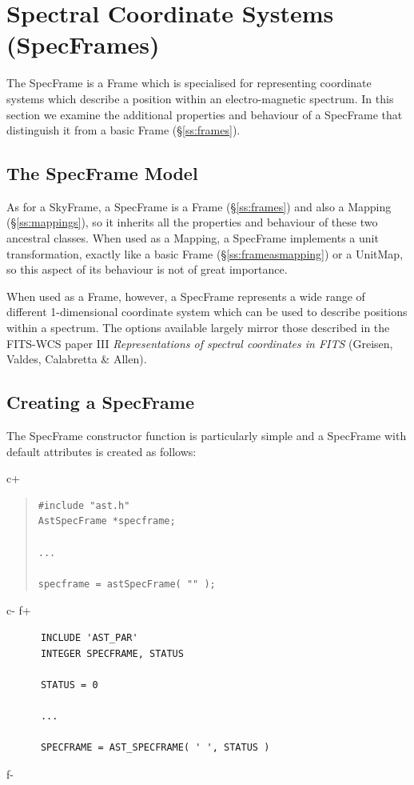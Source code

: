 \documentclass[twoside,11pt]{article}
\newcommand{\xlabel}[1]{}
\newcommand{\secref}[1]{\S\ref{#1}}
\newcommand{\secref}[1]{\ref{#1}}
\begin{document}
\cleardoublepage
\section{\xlabel{ss_specframes}\label{ss:specframes}Spectral Coordinate Systems (SpecFrames)}

The SpecFrame is a Frame which is specialised for representing coordinate
systems which describe a position within an electro-magnetic spectrum.
In this section we examine the additional properties and behaviour of a
SpecFrame that distinguish it from a basic Frame (\secref{ss:frames}).

\subsection{The SpecFrame Model}

As for a SkyFrame, a SpecFrame is a Frame (\secref{ss:frames}) and also a
Mapping (\secref{ss:mappings}), so it inherits all the properties and
behaviour of these two ancestral classes.  When used as a Mapping, a
SpecFrame implements a unit transformation, exactly like a basic Frame
(\secref{ss:frameasmapping}) or a UnitMap, so this aspect of its
behaviour is not of great importance.

When used as a Frame, however, a SpecFrame represents a wide range of
different 1-dimensional coordinate system which can be used to describe
positions within a spectrum. The options available largely mirror those
described in the FITS-WCS paper III \emph{Representations of spectral
coordinates in FITS} (Greisen, Valdes, Calabretta \& Allen).

\subsection{Creating a SpecFrame}

The SpecFrame constructor function is particularly simple and a
SpecFrame with default attributes is created as follows:

c+
\begin{quote}
\small
\begin{verbatim}
#include "ast.h"
AstSpecFrame *specframe;

...

specframe = astSpecFrame( "" );
\end{verbatim}
\normalsize
\end{quote}
c-
f+
\small
\begin{verbatim}
      INCLUDE 'AST_PAR'
      INTEGER SPECFRAME, STATUS

      STATUS = 0

      ...

      SPECFRAME = AST_SPECFRAME( ' ', STATUS )
\end{verbatim}
\normalsize
f-
\end{document}
